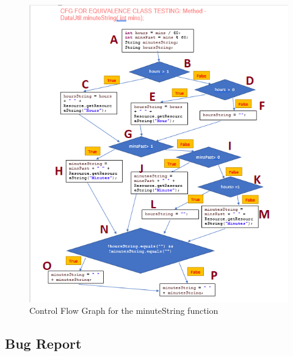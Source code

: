 \documentclass[fontsize=12pt,paper=letter,twoside]{scrartcl}
\begin{document}
\begin{itemize}
\begin{figure}[!htb]
\begin{center}
\includegraphics[width=.99\textwidth]{images/wbt/ect/cfg.png}
\end{center}
\caption{Control Flow Graph for the minuteString function}
\label{fig:wbt_ect_cfg}
\end{figure}




\subsection{Bug Report}


\end{itemize}
\end{document}
